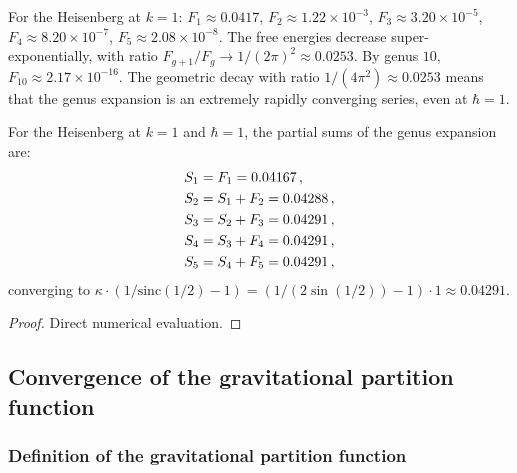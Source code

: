 \begin{remark}
For the Heisenberg at $k = 1$: $F_1 \approx 0.0417$, $F_2 \approx 1.22 \times 10^{-3}$, $F_3 \approx 3.20 \times 10^{-5}$, $F_4 \approx 8.20 \times 10^{-7}$, $F_5 \approx 2.08 \times 10^{-8}$. The free energies decrease super-exponentially, with ratio $F_{g+1}/F_g \to 1/(2\pi)^2 \approx 0.0253$. By genus $10$, $F_{10} \approx 2.17 \times 10^{-16}$. The geometric decay with ratio $1/(4\pi^2) \approx 0.0253$ means that the genus expansion is an extremely rapidly converging series, even at $\hbar = 1$.
\end{remark}

\begin{proposition}
For the Heisenberg at $k = 1$ and $\hbar = 1$, the partial sums of the genus expansion are:
\begin{align}
S_1 &= F_1 = 0.04167\,, \notag \\
S_2 &= S_1 + F_2 = 0.04288\,, \notag \\
S_3 &= S_2 + F_3 = 0.04291\,, \notag \\
S_4 &= S_3 + F_4 = 0.04291\,, \notag \\
S_5 &= S_4 + F_5 = 0.04291\,, %
\end{align}
converging to $\kappa \cdot (1/\mathrm{sinc}(1/2) - 1) = (1/(2\sin(1/2)) - 1) \cdot 1 \approx 0.04291$.
\end{proposition}

\begin{proof}
Direct numerical evaluation.
\end{proof}



\subsection{Convergence of the gravitational partition function}
\label{subsec:thqg-I-convergence-grav}

\subsubsection{Definition of the gravitational partition function}


